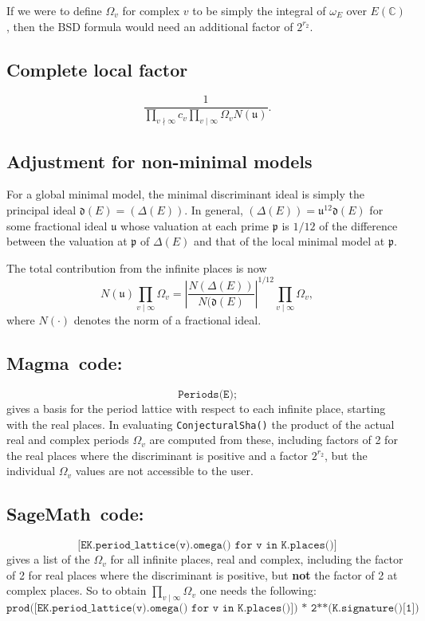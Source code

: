 \documentclass{amsart}
\newcommand{\software}[1]{\textsf{#1}} %
\newcommand{\Sage}{\software{SageMath}{}\ }
\newcommand{\Magma}{\software{Magma}{}\ }
\newcommand\C{\mathbb{C}}
\begin{document}
If we were to define \(\Omega_v\) for complex \(v\) to be simply the
integral of \(\omega_E\) over \(E(\C)\), then the BSD formula would need
an additional factor of \(2^{r_2}\).

\subsection{Complete local factor}\label{complete-local-factor}

\[\frac{1}{\prod_{v\nmid\infty}c_v\prod_{v\mid\infty}\Omega_v N(\mathfrak{u})}.\]

\subsection{Adjustment for non-minimal models}\label{adjustment-for-non-minimal-models}

For a global minimal model, the minimal discriminant ideal is simply the
principal ideal \(\mathfrak{d}(E)=(\Delta(E))\). In general,
\((\Delta(E))=\mathfrak{u}^{12}\mathfrak{d}(E)\) for some fractional
ideal \(\mathfrak{u}\) whose valuation at each prime \(\mathfrak{p}\) is
\(1/12\) of the difference between the valuation at \(\mathfrak{p}\) of
\(\Delta(E)\) and that of the local minimal model at \(\mathfrak{p}\).

The total contribution from the infinite places is now
\[N(\mathfrak{u})\prod_{v\mid\infty}\Omega_v = \left|\frac{N(\Delta(E))}{N(\mathfrak{d}(E)}\right|^{1/12}\prod_{v\mid\infty}\Omega_v,\]
where \(N(\cdot)\) denotes the norm of a fractional ideal.

\subsection{\Magma code:}\label{magma-5}
\[
\texttt{Periods(E);}
\]
gives a basis for the period lattice with respect to each infinite
place, starting with the real places. In evaluating
\texttt{ConjecturalSha()} the product of the actual real and complex
periods \(\Omega_v\) are computed from these, including factors of 2 for
the real places where the discriminant is positive and a factor
\(2^{r_2}\), but the individual \(\Omega_v\) values are not accessible
to the user.

\subsection{\Sage code:}\label{sage-5}

\[
\texttt{{[}EK.period\_lattice(v).omega()\ for\ v\ in\ K.places(){]}}
\]
gives a list of the \(\Omega_v\) for all infinite places, real and
complex, including the factor of 2 for real places where the
discriminant is positive, but \textbf{not} the factor of 2 at complex
places. So to obtain \(\prod_{v\mid\infty}\Omega_v\) one needs the
following:
\[
\texttt{prod({[}EK.period\_lattice(v).omega()\ for\ v\ in\ K.places(){]})\ *\ 2**(K.signature(){[}1{]})}
\]
\end{document}
